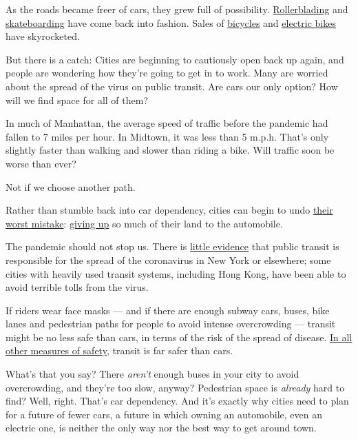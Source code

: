As the roads became freer of cars, they grew full of possibility.
\href{https://www.ktvu.com/news/rollerskaters-rejoice-throwback-activity-has-revival-during-pandemic}{Rollerblading}
and
\href{https://shop-eat-surf.com/2020/03/skateboard-sales-jump-during-crisis/}{skateboarding}
have come back into fashion. Sales of
\href{https://www.nytimes3xbfgragh.onion/2020/05/18/nyregion/bike-shortage-coronavirus.html}{bicycles}
and
\href{https://electrek.co/2020/05/01/electric-bike-sales-skyrocket-during-lockdown/}{electric
bikes} have skyrocketed.

But there is a catch: Cities are beginning to cautiously open back up
again, and people are wondering how they're going to get in to work.
Many are worried about the spread of the virus on public transit. Are
cars our only option? How will we find space for all of them?

In much of Manhattan, the average speed of traffic before the pandemic
had fallen to 7 miles per hour. In Midtown, it was less than 5 m.p.h.
That's only slightly faster than walking and slower than riding a bike.
Will traffic soon be worse than ever?

Not if we choose another path.

Rather than stumble back into car dependency, cities can begin to undo
\href{https://www.washingtonpost.com/news/in-theory/wp/2016/02/29/the-car-century-was-a-mistake-its-time-to-move-on/}{their
worst mistake}:
\href{https://www.newyorker.com/magazine/2019/07/29/was-the-automotive-era-a-terrible-mistake}{giving
up} so much of their land to the automobile.

The pandemic should not stop us. There is
\href{https://www.theatlantic.com/ideas/archive/2020/06/fear-transit-bad-cities/612979/}{little
evidence} that public transit is responsible for the spread of the
coronavirus in New York or elsewhere; some cities with heavily used
transit systems, including Hong Kong, have been able to avoid terrible
tolls from the virus.

If riders wear face masks --- and if there are enough subway cars,
buses, bike lanes and pedestrian paths for people to avoid intense
overcrowding --- transit might be no less safe than cars, in terms of
the risk of the spread of disease.
\href{https://mobilitylab.org/2016/09/08/transit-10-times-safer-driving-makes-communities-safer-says-new-apta-report/}{In
all other measures of safety,} transit is far safer than cars.

What's that you say? There \emph{aren't} enough buses in your city to
avoid overcrowding, and they're too slow, anyway? Pedestrian space is
\emph{already} hard to find? Well, right. That's car dependency. And
it's exactly why cities need to plan for a future of fewer cars, a
future in which owning an automobile, even an electric one, is neither
the only way nor the best way to get around town.

